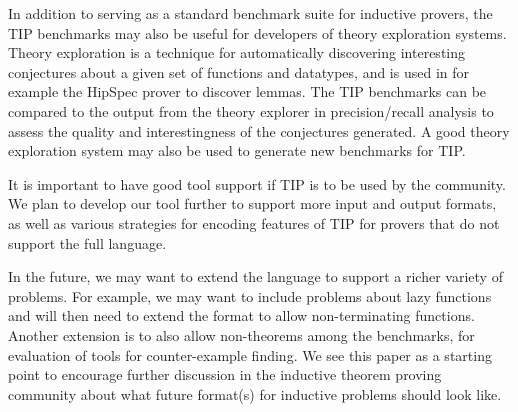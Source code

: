 \documentclass{llncs}
\begin{document}
In addition to serving as a standard benchmark suite for inductive provers, the TIP benchmarks may also be useful for developers of theory exploration systems. Theory exploration is a technique for automatically discovering interesting conjectures about a given set of functions and datatypes, and is used in for example the HipSpec prover to discover lemmas. The TIP benchmarks can be compared to the output from the theory explorer in precision/recall analysis to assess the quality and interestingness of the conjectures generated. A good theory exploration system may also be used to generate new benchmarks for TIP.

It is important to have good tool support if TIP is to be used by the
community. We plan to develop our tool further to support more input
and output formats, as well as various strategies for encoding
features of TIP for provers that do not support the full language.

In the future, we may want to extend the language to support a richer
variety of problems. For example,
we may want to include problems about lazy functions and will then need to extend the format to allow non-terminating functions.
Another extension is to also allow non-theorems among the benchmarks, for evaluation of tools for counter-example finding.  We see this paper as a starting point to encourage further discussion in the inductive theorem proving community about what future format(s) for inductive problems should look like.





\end{document}

